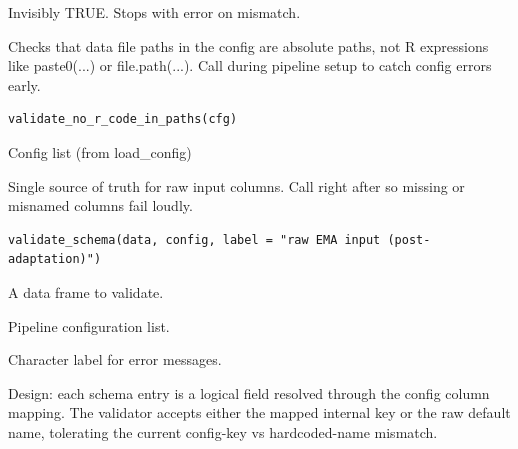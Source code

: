 \documentclass[a4paper]{book}
\begin{document}
%
\begin{Value}
Invisibly TRUE. Stops with error on mismatch.
\end{Value}
%
\begin{Description}
Checks that data file paths in the config are absolute paths, not
R expressions like paste0(...) or file.path(...). Call during
pipeline setup to catch config errors early.
\end{Description}
%
\begin{Usage}
\begin{verbatim}
validate_no_r_code_in_paths(cfg)
\end{verbatim}
\end{Usage}
%
\begin{Arguments}
\begin{ldescription}
\item[\code{cfg}] Config list (from load\_config)
\end{ldescription}
\end{Arguments}
%
\begin{Description}
Single source of truth for raw input columns. Call right after
 so missing or misnamed columns fail loudly.
\end{Description}
%
\begin{Usage}
\begin{verbatim}
validate_schema(data, config, label = "raw EMA input (post-adaptation)")
\end{verbatim}
\end{Usage}
%
\begin{Arguments}
\begin{ldescription}
\item[\code{data}] A data frame to validate.
\item[\code{config}] Pipeline configuration list.
\item[\code{label}] Character label for error messages.
\end{ldescription}
\end{Arguments}
%
\begin{Details}
Design: each schema entry is a logical field resolved through the config
column mapping. The validator accepts either the mapped internal key or the
raw default name, tolerating the current config-key vs hardcoded-name
mismatch.
\end{Details}
\end{document}

